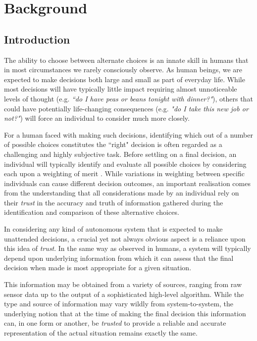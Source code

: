 \section{Background}

\subsection{Introduction}

The ability to choose between alternate choices is an innate skill in humans that in most circumstances we rarely consciously observe. As human beings, we are expected to make decisions both large and small as part of everyday life. While most decisions will have typically little impact requiring almost unnoticeable levels of thought (e.g. \textit{``do I have peas or beans tonight with dinner?"}), others that could have potentially life-changing consequences (e.g. \textit{"do I take this new job or not?"}) will force an individual to consider much more closely.

For a human faced with making such decisions, identifying which out of a number of possible choices constitutes the ``right" decision is often regarded as a challenging and highly subjective task. %
Before settling on a final decision, an individual will typically identify and evaluate all possible choices by considering each upon a weighting of merit \cite{rational-decision-model}. While variations in weighting between specific individuals can cause different decision outcomes, an important realisation comes from the understanding that all considerations made by an individual rely on their \textit{trust} in the accuracy and truth of information gathered during the identification and comparison of these alternative choices.

 In considering any kind of autonomous system that is expected to make unattended decisions, a crucial yet not always obvious aspect is a reliance upon this idea of \textit{trust}. In the same way as observed in humans, a system will typically depend upon underlying information from which it can assess that the final decision when made is most appropriate for a given situation.
 
 This information may be obtained from a variety of sources, ranging from raw sensor data up to the output of a sophisticated high-level algorithm. While the type and source of information may vary wildly from system-to-system, the underlying notion that at the time of making the final decision this information can, in one form or another, be \textit{trusted} to provide a reliable and accurate representation of the actual situation remains exactly the same. 
 
